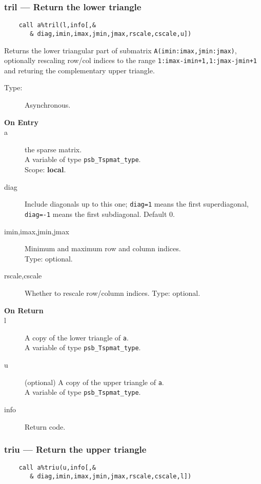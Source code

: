 \subsubsection*{tril --- Return the lower triangle}
\begin{verbatim}
    call a%tril(l,info[,&
       & diag,imin,imax,jmin,jmax,rscale,cscale,u])
\end{verbatim}

Returns the lower triangular part of submatrix
\verb|A(imin:imax,jmin:jmax)|, optionally rescaling row/col indices to
the range \verb|1:imax-imin+1,1:jmax-jmin+1| and returing the
complementary upper triangle. 
\begin{description}
\item[Type:] Asynchronous.
\item[\bf On Entry]
\item[a] the sparse matrix.\\
A variable of type \verb|psb_Tspmat_type|.\\
Scope: {\bf local}.\\
\item[diag] Include diagonals up to this one; \verb|diag=1| means the
  first superdiagonal, \verb|diag=-1| means the first subdiagonal. 
Default 0.
\item[imin,imax,jmin,jmax] Minimum and maximum row and column indices.\\
Type: optional.
\item[rscale,cscale] Whether to rescale row/column indices.
Type: optional.
\end{description}
\begin{description}
\item[\bf On Return]
\item[l] A copy  of the lower triangle of \verb|a|.\\
A variable of type \verb|psb_Tspmat_type|.
\item[u] (optional) A copy  of the upper triangle of \verb|a|.\\
A variable of type \verb|psb_Tspmat_type|.
\item[info] Return code. 
\end{description}

\subsubsection*{triu --- Return the upper triangle}
\begin{verbatim}
    call a%triu(u,info[,&
       & diag,imin,imax,jmin,jmax,rscale,cscale,l])
\end{verbatim}

